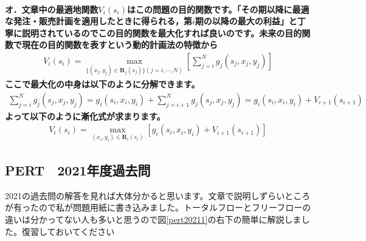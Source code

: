 \documentclass{jsarticle}
\begin{document}
\paragraph{オ．文章中の最適地関数$V_i(s_i)$はこの問題の目的関数です。「その期以降に最適な発注・販売計画を適用したときに得られる，第$i$期の以降の最大の利益」と丁寧に説明されているのでこの目的関数を最大化すれば良いのです。未来の目的関数で現在の目的関数を表すという動的計画法の特徴から
\begin{align*}
V_i(s_i)=\underset{\{(x_j,y_j)\in \bm{R}_j(s_j)\}(j=i,\cdots,N)}{\max}\left[\sum_{j=i}^N g_j(s_j,x_j,y_j)\right]
\end{align*}
ここで最大化の中身は以下のように分解できます。
\begin{align*}
\sum_{j=i}^N g_j(s_j,x_j,y_j)=g_i(s_i,x_i,y_i) +\sum_{j=i+1}^N g_j(s_j,x_j,y_j)=g_i(s_i,x_i,y_i)+V_{i+1}(s_{i+1})
\end{align*}
よって以下のように漸化式が求まります。
\begin{align*}
V_i(s_i)=\underset{(x_i,y_i)\in \bm{R}_i(s_i)}{\max}\left[g_i(s_i,x_i,y_i)+V_{i+1}(s_{i+1})\right]
\end{align*}}

\subsection{PERT　2021年度過去問\label{pert2021}}

2021の過去問の解答を見れば大体分かると思います。文章で説明しずらいところが有ったので私が問題用紙に書き込みました。トータルフローとフリーフローの違いは分かってない人も多いと思うので図\ref{pert20211}の右下の簡単に解説しました。復習しておいてください
\end{document}
